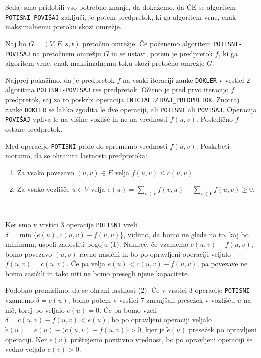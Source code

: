 \documentclass[mat1]{fmfdelo}
\begin{document}
Sedaj smo pridobili vso potrebno znanje, da dokažemo, da ČE se algoritem \texttt{POTISNI-POVIŠAJ} zaključi, je potem predpretok, ki ga algoritem vrne, enak maksimalnemu pretoku skozi omrežje.

\begin{izrek}
Naj bo $G=(V,E,s,t)$ pretočno omrežje. Če poženemo algoritem \texttt{POTISNI-POVIŠAJ} na pretočnem omrežju $G$ in se ustavi, potem je predpretok $f$, ki ga algoritem vrne, enak maksimalnemu toku skozi pretočno omrežje $G$.
\end{izrek}

\begin{dokaz}
Najprej pokažimo, da je predpretok $f$ na vsaki iteraciji zanke \texttt{DOKLER} v vrstici 2 algoritma \texttt{POTISNI-POVIŠAJ} res predpretok. Očitno je pred prvo iteracijo $f$ predpretok, saj za to poskrbi operacija \texttt{INICIALIZIRAJ\_PREDPRETOK}. Znotraj zanke \texttt{DOKLER} se lahko zgodita le dve operaciji, ali \texttt{POTISNI} ali \texttt{POVIŠAJ}. Operacija \texttt{POVIŠAJ} vpliva le na višine vozlišč in ne na vrednosti $f(u,v)$. Posledično $f$ ostane predpretok.

Med operacijo \texttt{POTISNI} pride do sprememb vrednosti $f(u,v)$. Poskrbeti moramo, da se ohranita lastnosti predpretoka:\\

\begin{enumerate}
\item Za vsako povezavo $(u,v) \in E$ velja $f(u,v) \leq c(u,v)$.
\item Za vsako vozlišče $u \in V$ velja $e(u) = \sum_{v\in V} f(v,u) - \sum_{v\in V} f(u,v) \geq 0$.
\end{enumerate}~

Ker smo v vrstici 3 operacije \texttt{POTISNI} vzeli $\delta = \min\{e(u), c(u,v) - f(u,v)\}$, vidimo, da bomo ne glede na to, kaj bo minimum, uspeli zadostiti pogoju (1). Namreč, če vzamemo $c(u,v) - f(u,v)$, bomo povezavo $(u,v)$ ravno nasičili in bo po opravljeni operaciji veljalo $f(u,v) = c(u,v)$. Če pa velja $e(u) < c(u,v) - f(u,v)$, pa povezave ne bomo zasičili in tako niti ne bomo presegli njene kapacitete.

Podobno premislimo, da se ohrani lastnost (2). Če v vrstici 3 operacije \texttt{POTISNI} vzamemo $\delta = e(u)$, bomo potem v vrstici 7 zmanjšali presežek v vozlišču $u$ na nič, torej bo veljalo $e(u) = 0$. Če pa bomo vzeli $\delta = c(u,v) - f(u,v) < e(u)$, bo po opravljeni operaciji veljalo $\tilde{e}(u) = e(u) - \big(c(u,v) - f(u,v)\big) > 0$, kjer je $\tilde{e}(u)$ presežek po opravljeni operaciji. Ker $e(v)$ prištejemo pozitivno vrednost, bo po opravljeni operaciji še vedno veljalo $e(v) > 0$.\\


\end{dokaz}
\end{document}
